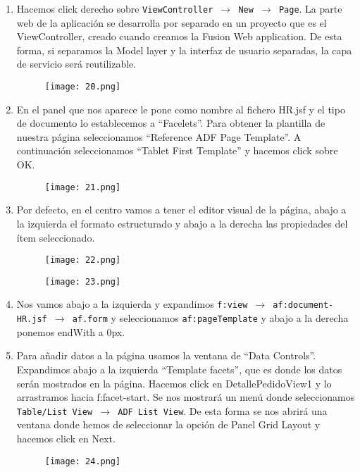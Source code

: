 \begin{enumerate}
	\item Hacemos click derecho sobre \texttt{ViewController $\rightarrow$ New $\rightarrow$ Page}. La parte web de la aplicación se desarrolla por separado en un proyecto que es el ViewController, creado cuando creamos la Fusion Web application. De esta forma, si separamos la Model layer y la interfaz de usuario separadas, la capa de servicio será reutilizable.
	\begin{figure}[!h]
	  \centering
	    \texttt{[image: 20.png]}
	\end{figure}
	\item En el panel que nos aparece le pone como nombre al fichero HR.jsf y el tipo de documento lo establecemos a ``Facelets''. Para obtener la plantilla de nuestra página seleccionamos ``Reference ADF Page Template''. A continuación seleccionamos ``Tablet First Template'' y hacemos click sobre OK.
	\begin{figure}[!h]
	  \centering
	    \texttt{[image: 21.png]}
	\end{figure}
	\item Por defecto, en el centro vamos a tener el editor visual de la página, abajo a la izquierda el formato estructurado y abajo a la derecha las propiedades del ítem seleccionado.
	\begin{figure}[!h]
	  \centering
	    \texttt{[image: 22.png]}
	\end{figure}
	\pagebreak
	\begin{figure}[!h]
	  \centering
	    \texttt{[image: 23.png]}
	\end{figure}
	\item Nos vamos abajo a la izquierda y expandimos \texttt{f:view $\rightarrow$ af:document-HR.jsf $\rightarrow$ af.form} y seleccionamos \texttt{af:pageTemplate} y abajo a la derecha ponemos endWith a 0px.
	\item Para añadir datos a la página usamos la ventana de ``Data Controls''. Expandimos abajo a la izquierda ``Template facets'', que es donde los datos serán mostrados en la página.  Hacemos click en DetallePedidoView1 y lo arrastramos hacia f:facet-start. Se nos mostrará un menú donde seleccionamos \texttt{Table/List View $\rightarrow$ ADF List View}. De esta forma se nos abrirá una ventana donde hemos de seleccionar la opción de Panel Grid Layout y hacemos click en Next.
	\begin{figure}[!h]
	  \centering
	    \texttt{[image: 24.png]}
	\end{figure}

\end{enumerate}
